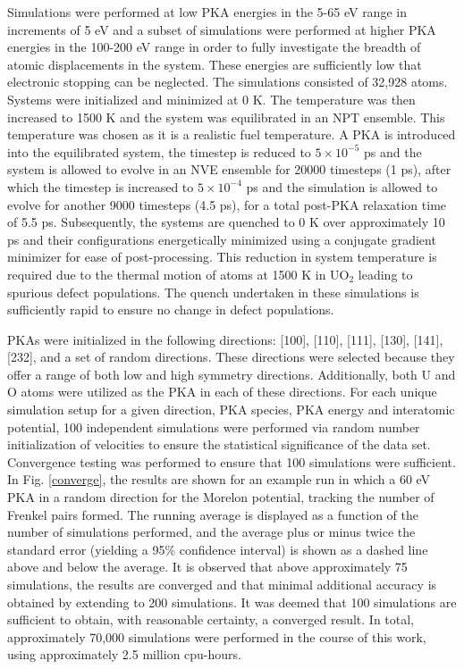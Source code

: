 \documentclass[review]{elsarticle}
\begin{document}
Simulations were performed at low PKA energies in the 5-65 eV range in increments of 5 eV and a subset of simulations were performed at higher PKA energies in the 100-200 eV range in order to fully investigate the breadth of atomic displacements in the system. These energies are sufficiently low that electronic stopping can be neglected. The simulations consisted of 32,928 atoms. Systems were initialized and minimized at 0 K. The temperature was then increased to 1500 K and the system was equilibrated in an NPT ensemble. This temperature was chosen as it is a realistic fuel temperature. A PKA is introduced into the equilibrated system, the timestep is reduced to $5\times10^{-5}$ ps and the system is allowed to evolve in an NVE ensemble for 20000 timesteps (1 ps), after which the timestep is increased to $5\times10^{-4}$ ps and the simulation is allowed to evolve for another 9000 timesteps (4.5 ps), for a total post-PKA relaxation time of 5.5 ps. Subsequently, the systems are quenched to 0 K over approximately 10 ps and their configurations energetically minimized using a conjugate gradient minimizer for ease of post-processing. This reduction in system temperature is required due to the thermal motion of atoms at 1500 K in UO$_2$ leading to spurious defect populations. The quench undertaken in these simulations is sufficiently rapid to ensure no change in defect populations.

PKAs were initialized in the following directions: [100], [110], [111], [130], [141], [232], and a set of random directions. These directions were selected because they offer a range of both low and high symmetry directions. Additionally, both U and O atoms were utilized as the PKA in each of these directions. For each unique simulation setup for a given direction, PKA species, PKA energy and interatomic potential, 100 independent simulations were performed via random number initialization of velocities to ensure the statistical significance of the data set. Convergence testing was performed to ensure that 100 simulations were sufficient. In Fig. \ref{converge}, the results are shown for an example run in which a 60 eV PKA in a random direction for the Morelon potential, tracking the number of Frenkel pairs formed. The running average is displayed as a function of the number of simulations performed, and the average plus or minus twice the standard error (yielding a 95\% confidence interval) is shown as a dashed line above and below the average. It is observed that above approximately 75 simulations, the results are converged and that minimal additional accuracy is obtained by extending to 200 simulations. It was deemed that 100 simulations are sufficient to obtain, with reasonable certainty, a converged result. In total, approximately 70,000 simulations were performed in the course of this work, using approximately 2.5 million cpu-hours.
\end{document}
